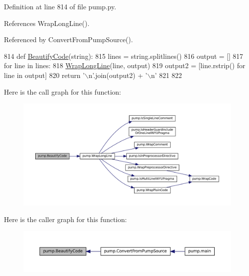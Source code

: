 Definition at line 814 of file pump.\+py.



References Wrap\+Long\+Line().



Referenced by Convert\+From\+Pump\+Source().


\begin{DoxyCode}
814 \textcolor{keyword}{def }\hyperlink{namespacepump_a3456db8d85605892d670669c4e238cd7}{BeautifyCode}(string):
815   lines = string.splitlines()
816   output = []
817   \textcolor{keywordflow}{for} line \textcolor{keywordflow}{in} lines:
818     \hyperlink{namespacepump_a02427e2ddc80f0f408e27dfc3e38e702}{WrapLongLine}(line, output)
819   output2 = [line.rstrip() \textcolor{keywordflow}{for} line \textcolor{keywordflow}{in} output]
820   \textcolor{keywordflow}{return} \textcolor{stringliteral}{'\(\backslash\)n'}.join(output2) + \textcolor{stringliteral}{'\(\backslash\)n'}
821 
822 
\end{DoxyCode}
Here is the call graph for this function\+:
\nopagebreak
\begin{figure}[H]
\begin{center}
\leavevmode
\includegraphics[width=350pt]{namespacepump_a3456db8d85605892d670669c4e238cd7_cgraph}
\end{center}
\end{figure}
Here is the caller graph for this function\+:
\nopagebreak
\begin{figure}[H]
\begin{center}
\leavevmode
\includegraphics[width=350pt]{namespacepump_a3456db8d85605892d670669c4e238cd7_icgraph}
\end{center}
\end{figure}
\mbox{\label{namespacepump_a568fe53d1443489ac15bac4a0f9faf91}} 

